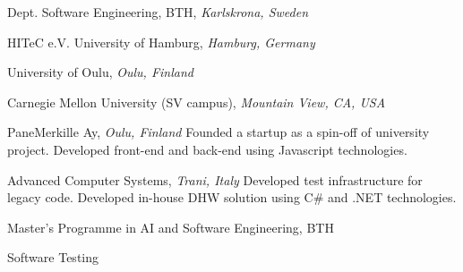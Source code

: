 \documentclass[9pt]{article}
\begin{document}
\noindent Dept. Software Engineering, BTH, \emph{Karlskrona, Sweden} \vspace{0.01in} 
\newline{}
\bigskip

\noindent HITeC e.V. \amper{} University of Hamburg, \emph{Hamburg, Germany} \vspace{0.01in} 
\newline{}
\bigskip

\noindent University of Oulu, \emph{Oulu, Finland} \vspace{0.01in} 
\newline{}
\bigskip

\noindent Carnegie Mellon University (SV campus), \emph{Mountain View, CA, USA} \vspace{0.01in}  
\newline{}
\bigskip

\noindent PaneMerkille Ay, \emph{Oulu, Finland} \vspace{0.01in} 
\newline{}
\newline\noindent Founded a startup as a spin-off of university project.
\newline\noindent Developed front-end and back-end using Javascript technologies.
\bigskip

\noindent Advanced Computer Systems, \emph{Trani, Italy} \vspace{0.01in} 
\newline{}
\newline\noindent Developed test infrastructure for legacy code.
\newline\noindent Developed in-house DHW solution using C\# and .NET technologies.
\bigskip

\noindent Master's Programme in AI and Software Engineering, BTH \vspace{0.01in} 
\newline{}
\bigskip

  
\newline\noindent Software Testing 
\bigskip
\end{document}
